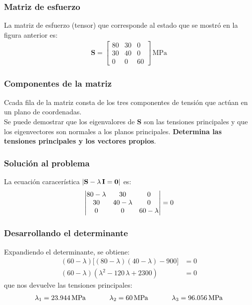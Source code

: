 \documentclass[12pt]{beamer}
\begin{document}
\begin{frame}
\frametitle{Matriz de esfuerzo}
La matriz de esfuerzo (tensor) que corresponde al estado que se mostró en la figura anterior es:
\pause
\begin{align*}
\mathbf{S} = 
\begin{bmatrix}
80 & 30 & 0 \\
30 & 40 & 0 \\
0 & 0 & 60
\end{bmatrix}
\, \text{MPa}
\end{align*}
\end{frame}
\begin{frame}
\frametitle{Componentes de la matriz}
Ccada fila de la matriz consta de los tres componentes de tensión que actúan en un plano de coordenadas.
\\
\bigskip
\pause
Se puede demostrar que los eigenvalores de $\mathbf{S}$ son las tensiones principales y que los eigenvectores son normales a los planos principales. \pause \textbf{Determina las tensiones principales y los vectores propios}.
\end{frame}
\begin{frame}
\frametitle{Solución al problema}
La ecuación caracerística $\abs{\mathbf{S} - \lambda \, \mathbf{I} = \mathbf{0}}$ es:
\pause
\begin{align*}
\mdet{
80 - \lambda & 30 & 0 \\
30 & 40 - \lambda & 0 \\
0 & 0 & 60 - \lambda
} = 0
\end{align*}
\end{frame}
\begin{frame}
\frametitle{Desarrollando el determinante}
Expandiendo el determinante, se obtiene:
\pause
\begin{align*}
(60 - \lambda) \big[ (80 - \lambda) (40 - \lambda) - 900 \big] &= 0 \\[0.5em]
(60 - \lambda) (\lambda^{2} - 120 \, \lambda + 2300) &= 0
\end{align*}
\pause
que nos devuelve las tensiones principales:
\pause
\begin{align*}
\lambda_{1} = \SI{23.944}{\mega\pascal} \hspace{1.2cm} \lambda_{2} = \SI{60}{\mega\pascal} \hspace{1.2cm} \lambda_{3} = \SI{96.056}{\mega\pascal}
\end{align*}
\end{frame}
\end{document}
